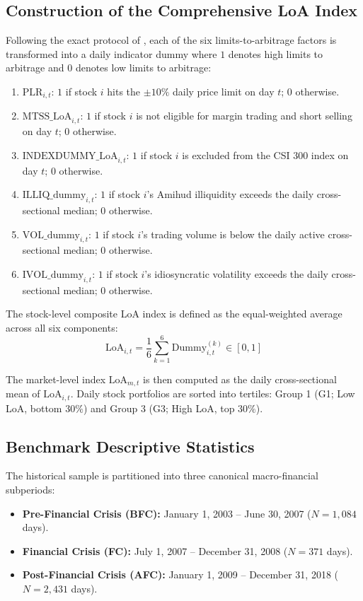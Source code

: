 \documentclass[12pt, a4paper]{article}
\begin{document}
\subsection{Construction of the Comprehensive LoA Index}

Following the exact protocol of \citet{Gu2018}, each of the six limits-to-arbitrage factors is transformed into a daily indicator dummy where $1$ denotes high limits to arbitrage and $0$ denotes low limits to arbitrage:
\begin{enumerate}[label=\arabic*.]
  \item $\mathrm{PLR}_{i,t}$: $1$ if stock $i$ hits the $\pm10\%$ daily price limit on day $t$; $0$ otherwise.
  \item $\mathrm{MTSS\_LoA}_{i,t}$: $1$ if stock $i$ is not eligible for margin trading and short selling on day $t$; $0$ otherwise.
  \item $\mathrm{INDEXDUMMY\_LoA}_{i,t}$: $1$ if stock $i$ is excluded from the CSI 300 index on day $t$; $0$ otherwise.
  \item $\mathrm{ILLIQ\_dummy}_{i,t}$: $1$ if stock $i$'s Amihud illiquidity exceeds the daily cross-sectional median; $0$ otherwise.
  \item $\mathrm{VOL\_dummy}_{i,t}$: $1$ if stock $i$'s trading volume is below the daily active cross-sectional median; $0$ otherwise.
  \item $\mathrm{IVOL\_dummy}_{i,t}$: $1$ if stock $i$'s idiosyncratic volatility exceeds the daily cross-sectional median; $0$ otherwise.
\end{enumerate}

The stock-level composite LoA index is defined as the equal-weighted average across all six components:
\begin{equation}
  \mathrm{LoA}_{i,t} = \frac{1}{6} \sum_{k=1}^6 \mathrm{Dummy}_{i,t}^{(k)} \in [0, 1]
\end{equation}

The market-level index $\mathrm{LoA}_{m,t}$ is then computed as the daily cross-sectional mean of $\mathrm{LoA}_{i,t}$. Daily stock portfolios are sorted into tertiles: Group 1 (G1; Low LoA, bottom $30\%$) and Group 3 (G3; High LoA, top $30\%$).

\subsection{Benchmark Descriptive Statistics}

The historical sample is partitioned into three canonical macro-financial subperiods:
\begin{itemize}
  \item \textbf{Pre-Financial Crisis (BFC):} January 1, 2003 -- June 30, 2007 ($N=1{,}084$ days).
  \item \textbf{Financial Crisis (FC):} July 1, 2007 -- December 31, 2008 ($N=371$ days).
  \item \textbf{Post-Financial Crisis (AFC):} January 1, 2009 -- December 31, 2018 ($N=2{,}431$ days).
\end{itemize}
\end{document}
